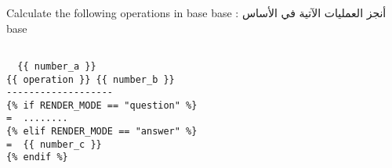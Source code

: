 Calculate  the following operations in base {{ base }} :  أنجز العمليات الآتية في الأساس {{ base }}

\begin{verbatim}

  {{ number_a }}
{{ operation }} {{ number_b }}
-------------------
{% if RENDER_MODE == "question" %}
=  ........
{% elif RENDER_MODE == "answer" %}
=  {{ number_c }}
{% endif %}

\end{verbatim}
